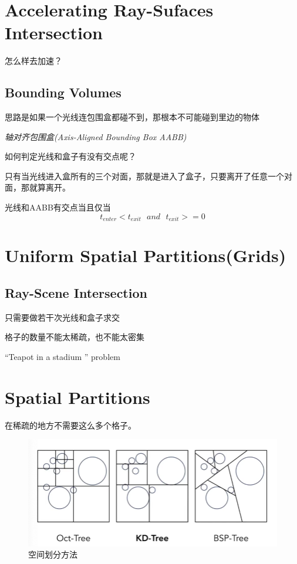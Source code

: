 \section{Accelerating Ray-Sufaces Intersection}

怎么样去加速？

\subsection*{Bounding Volumes}

思路是如果一个光线连包围盒都碰不到，那根本不可能碰到里边的物体

\textsl{轴对齐包围盒(Axis-Aligned Bounding Box AABB)}

如何判定光线和盒子有没有交点呢？

只有当光线进入盒所有的三个对面，那就是进入了盒子，只要离开了任意一个对面，那就算离开。

光线和AABB有交点当且仅当
\begin{equation}
    t_{enter}<t_{exit}\ \ \  and\ \ \ t_{exit}>=0
\end{equation}

\section{Uniform Spatial Partitions(Grids)}

\subsection*{Ray-Scene Intersection}

只需要做若干次光线和盒子求交

格子的数量不能太稀疏，也不能太密集

“Teapot in a stadium ” problem

\section{Spatial Partitions}

在稀疏的地方不需要这么多个格子。
\begin{figure}[H]
    \centering
    \includegraphics[scale=0.4]{figures/空间划分.png}
    \caption{空间划分方法}
\end{figure}

